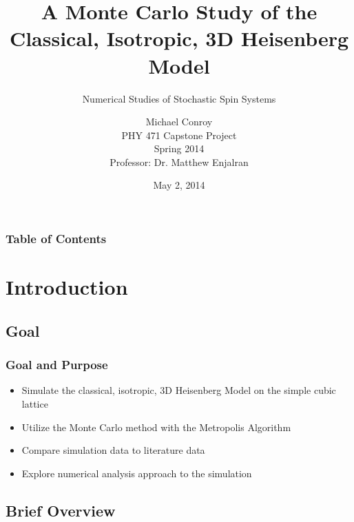 \documentclass{beamer}
\title[Monte Carlo Study of 3d Heisenberg Model]{A Monte Carlo Study of the Classical, Isotropic, 3D Heisenberg Model}
\subtitle{Numerical Studies of Stochastic Spin Systems}
\author[Michael Conroy]{Michael Conroy\\
  PHY 471 Capstone Project \\
  Spring 2014 \\
  Professor: Dr. Matthew Enjalran}
\date{May 2, 2014}
\begin{document}
	\begin{frame}
	\titlepage
	\end{frame}

	\begin{frame}
		\frametitle{Table of Contents}
		\tableofcontents
	\end{frame}

	\section{Introduction}
	
	\subsection{Goal}
  \begin{frame}
    \frametitle{Goal and Purpose}
    	\begin{itemize}
    		\item Simulate the classical, isotropic, 3D Heisenberg Model on the simple cubic lattice
    		\item Utilize the Monte Carlo method with the Metropolis Algorithm
    		\item Compare simulation data to literature data
    		\item Explore numerical analysis approach to the simulation
    	\end{itemize}
  \end{frame}
  
  \subsection{Brief Overview}
\end{document}
